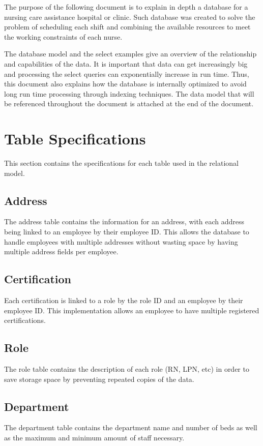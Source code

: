 \documentclass[letter,12pt]{texMemo}
\begin{document}
\maketitle
The purpose of the following document is to explain in depth a database for a nursing care assistance hospital or clinic. Such database was created to solve the problem of scheduling each shift and combining the available resources to meet the working constraints of each nurse.

The database model and the select examples give an overview of the relationship and capabilities of the data. It is important that data can get increasingly big and processing the select queries can exponentially increase in run time. Thus, this document also explains how the database is internally optimized to avoid long run time processing through indexing techniques. The data model that will be referenced throughout the document is attached at the end of the document.
\section*{Table Specifications}
This section contains the specifications for each table used in the relational model.
	\subsection*{Address}
		The address table contains the information for an address, with each address being linked to an employee by their employee ID. This allows the database to handle employees with multiple addresses without wasting space by having multiple address fields per employee.
		
	\newpage
	\subsection*{Certification}
		Each certification is linked to a role by the role ID and an employee by their employee ID. This implementation allows an employee to have multiple registered certifications.
		
	\subsection*{Role}
		The role table contains the description of each role (RN, LPN, etc) in order to save storage space by preventing repeated copies of the data.
		
	\subsection*{Department}
		The department table contains the department name and number of beds as well as the maximum and minimum amount of staff necessary.
		
	\newpage
\end{document}
